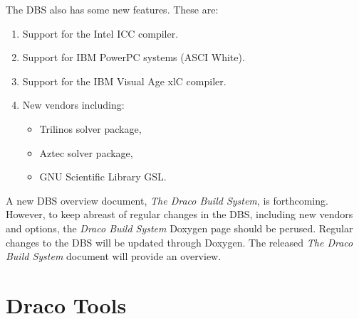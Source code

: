 \documentclass[11pt]{nmemo}
\begin{document}
The DBS also has some new features.  These are:
\begin{enumerate}
\item Support for the \textsf{Intel ICC} compiler.
\item Support for IBM PowerPC systems (ASCI White).
\item Support for the IBM \textsf{Visual Age xlC} compiler.
\item New vendors including:
  \begin{itemize}
  \item Trilinos solver package,
  \item Aztec solver package,
  \item GNU Scientific Library GSL.
  \end{itemize}
\end{enumerate}

A new DBS overview document, \textit{The Draco Build System}, is
forthcoming.  However, to keep abreast of regular changes in the DBS,
including new vendors and options, the \textit{Draco Build System}
\textsf{Doxygen} \cite{doxygen} page should be perused.  Regular
changes to the DBS will be updated through \textsf{Doxygen}.  The
released \textit{The Draco Build System} document will provide an
overview.


\section{Draco Tools}
\end{document}

